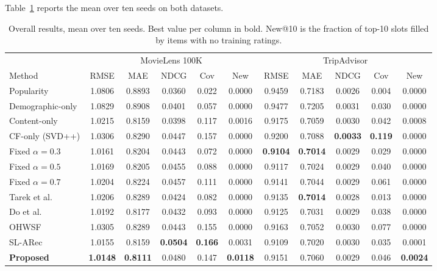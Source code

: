 \documentclass[runningheads]{llncs}
\begin{document}
Table~\ref{tab:overall} reports the mean over ten seeds on both datasets.

\begin{table}[t]
  \caption{Overall results, mean over ten seeds. Best value per column in bold. New@10 is the fraction of top-10 slots filled by items with no training ratings.}
  \label{tab:overall}
  \centering
  \small
  \setlength{\tabcolsep}{4pt}
  \begin{tabular}{l ccccc ccccc}
    \toprule
    & \multicolumn{5}{c}{MovieLens 100K} & \multicolumn{5}{c}{TripAdvisor} \\
    \cmidrule(lr){2-6}\cmidrule(lr){7-11}
    Method & RMSE & MAE & NDCG & Cov & New & RMSE & MAE & NDCG & Cov & New \\
    \midrule
    Popularity        & 1.0806 & 0.8893 & 0.0360 & 0.022 & 0.0000 & 0.9459 & 0.7183 & 0.0026 & 0.004 & 0.0000 \\
    Demographic-only  & 1.0829 & 0.8908 & 0.0401 & 0.057 & 0.0000 & 0.9477 & 0.7205 & 0.0031 & 0.030 & 0.0000 \\
    Content-only      & 1.0215 & 0.8159 & 0.0398 & 0.117 & 0.0016 & 0.9175 & 0.7059 & 0.0030 & 0.042 & 0.0008 \\
    CF-only (SVD++)   & 1.0306 & 0.8290 & 0.0447 & 0.157 & 0.0000 & 0.9200 & 0.7088 & \textbf{0.0033} & \textbf{0.119} & 0.0000 \\
    \midrule
    Fixed $\alpha=0.3$ & 1.0161 & 0.8204 & 0.0443 & 0.072 & 0.0000 & \textbf{0.9104} & \textbf{0.7014} & 0.0029 & 0.029 & 0.0000 \\
    Fixed $\alpha=0.5$ & 1.0169 & 0.8205 & 0.0455 & 0.088 & 0.0000 & 0.9117 & 0.7024 & 0.0029 & 0.040 & 0.0000 \\
    Fixed $\alpha=0.7$ & 1.0204 & 0.8224 & 0.0457 & 0.111 & 0.0000 & 0.9141 & 0.7044 & 0.0029 & 0.061 & 0.0000 \\
    \midrule
    Tarek et al.~\cite{tarek2022}   & 1.0206 & 0.8289 & 0.0424 & 0.082 & 0.0000 & 0.9135 & \textbf{0.7014} & 0.0028 & 0.013 & 0.0000 \\
    Do et al.~\cite{do2020}         & 1.0192 & 0.8177 & 0.0432 & 0.093 & 0.0000 & 0.9125 & 0.7031 & 0.0029 & 0.038 & 0.0000 \\
    OHWSF~\cite{ohwsf2025}          & 1.0305 & 0.8289 & 0.0443 & 0.155 & 0.0000 & 0.9163 & 0.7052 & 0.0030 & 0.077 & 0.0000 \\
    SL-ARec~\cite{slarec2026}       & 1.0155 & 0.8159 & \textbf{0.0504} & \textbf{0.166} & 0.0031 & 0.9109 & 0.7020 & 0.0030 & 0.035 & 0.0001 \\
    \midrule
    \textbf{Proposed} & \textbf{1.0148} & \textbf{0.8111} & 0.0480 & 0.147 & \textbf{0.0118} & 0.9151 & 0.7060 & 0.0029 & 0.046 & \textbf{0.0024} \\
    \bottomrule
  \end{tabular}
\end{table}
\end{document}
